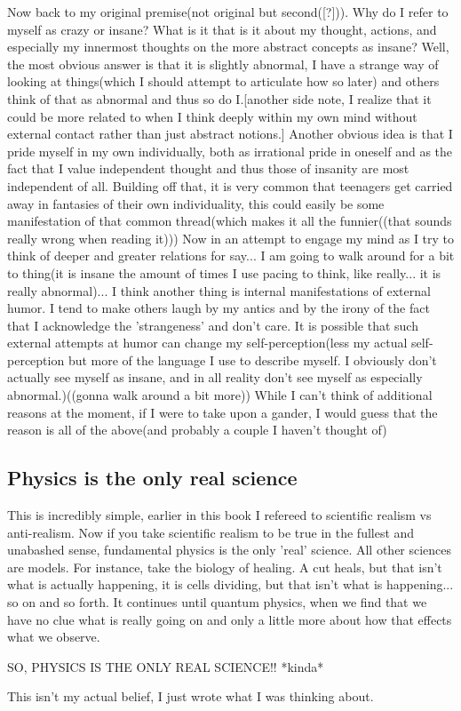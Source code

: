 \par Now back to my original premise(not original but second([?])). Why do I refer to myself as crazy or insane? What is it that is it about my thought, actions, and especially my innermost thoughts on the more abstract concepts as insane? Well, the most obvious answer is that it is slightly abnormal, I have a strange way of looking at things(which I should attempt to articulate how so later) and others think of that as abnormal and thus so do I.[another side note, I realize that it could be more related to when I think deeply within my own mind without external contact rather than just abstract notions.] Another obvious idea is that I pride myself in my own individually, both as irrational pride in oneself and as the fact that I value independent thought and thus those of insanity are most independent of all. Building off that, it is very common that teenagers get carried away in fantasies of their own individuality, this could easily be some manifestation of that common thread(which makes it all the funnier((that sounds really wrong when reading it))) Now in an attempt to engage my mind as I try to think of deeper and greater relations for say... I am going to walk around for a bit to thing(it is insane the amount of times I use pacing to think, like really... it is really abnormal)... I think another thing is internal manifestations of external humor. I tend to make others laugh by my antics and by the irony of the fact that I acknowledge the 'strangeness' and don't care. It is possible that such external attempts at humor can change my self-perception(less my actual self-perception but more of the language I use to describe myself. I obviously don't actually see myself as insane, and in all reality don't see myself as especially abnormal.)((gonna walk around a bit more)) While I can't think of additional reasons at the moment, if I were to take upon a gander, I would guess that the reason is all of the above(and probably a couple I haven't thought of)


\subsection{Physics is the only real science}
\par This is incredibly simple, earlier in this book I refereed to scientific realism vs anti-realism. Now if you take scientific realism to be true in the fullest and unabashed sense, fundamental physics is the only 'real' science. All other sciences are models. For instance, take the biology of healing. A cut heals, but that isn't what is actually happening, it is cells dividing, but that isn't what is happening... so on and so forth. It continues until quantum physics, when we find that we have no clue what is really going on and only a little more about how that effects what we observe.
\par SO, PHYSICS IS THE ONLY REAL SCIENCE!! *kinda*
\par This isn't my actual belief, I just wrote what I was thinking about.

